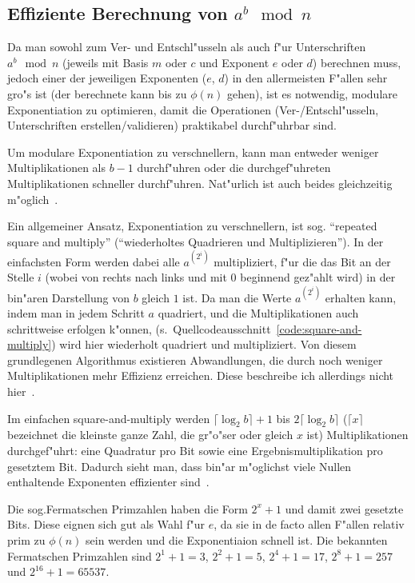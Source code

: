 \documentclass[12pt]{article}
\begin{document}
\subsection{Effiziente Berechnung von $a^b \mod n$}
\label{subsec:practical:exp}

Da man sowohl zum Ver- und Entschl"usseln als auch f"ur Unterschriften $a^b \mod n$
(jeweils mit Basis $m$ oder $c$ und Exponent $e$ oder $d$) berechnen muss,
jedoch einer der jeweiligen Exponenten ($e$, $d$) in den allermeisten F"allen
sehr gro"s ist (der berechnete kann bis zu $\phi(n)$ gehen),
ist es notwendig, modulare Exponentiation zu optimieren,
damit die Operationen (Ver-/Entschl"usseln, Unterschriften erstellen/validieren)
praktikabel durch\-f"uhr\-bar sind.

Um modulare Exponentiation zu verschnellern, kann man entweder weniger Multiplikationen
als $b-1$ durchf"uhren oder die durchgef"uhreten Multiplikationen schneller durchf"uhren.
Nat"urlich ist auch beides gleichzeitig m"oglich~\cite{hac}.

Ein allgemeiner Ansatz, Exponentiation zu verschnellern, ist sog.\@
"`repeated square and multiply"' ("`wiederholtes Quadrieren und Multiplizieren"').
In der einfachsten Form werden dabei alle $a^{(2^i)}$ multipliziert,
f"ur die das Bit an der Stelle $i$ (wobei von rechts nach links und mit 0 beginnend gez"ahlt wird)
in der bin"aren Darstellung von $b$ gleich $1$ ist.
Da man die Werte $a^{(2^i)}$ erhalten kann, indem man in jedem Schritt $a$ quadriert,
und die Multiplikationen auch schrittweise erfolgen k"onnen, (s.~Quell\-code\-aus\-schnitt~\ref{code:square-and-multiply})
wird hier wiederholt quadriert und multipliziert.
Von diesem grundlegenen Algorithmus existieren Abwandlungen,
die durch noch weniger Multiplikationen mehr Effizienz erreichen.
Diese beschreibe ich allerdings nicht hier~\cite{hac}.

Im einfachen square-and-multiply werden $\lceil \log_2 b \rceil + 1$ bis $2 \lceil \log_2 b \rceil$
($\lceil x \rceil$ bezeichnet die kleinste ganze Zahl, die gr"o"ser oder gleich $x$ ist)
Multiplikationen durchgef"uhrt: eine Quadratur pro Bit sowie eine Ergebnismultiplikation pro ge\-setz\-tem Bit.
Dadurch sieht man, dass bin"ar m"oglichst viele Nullen enthaltende Exponenten effizienter sind~\cite{hac}.

Die sog.\@ Fermatschen Primzahlen haben die Form $2^x + 1$ und damit zwei gesetzte Bits.
Diese eignen sich gut als Wahl f"ur $e$, da sie in de facto allen F"allen relativ prim zu
$\phi(n)$ sein werden und die Exponentiaion schnell ist.
Die bekannten Fermatschen Primzahlen sind $2^1 + 1 = 3$, $2^2+1 = 5$, $2^4 + 1 = 17$, $2^8+1 = 257$ und $2^{16} + 1 = 65537$.
\end{document}
